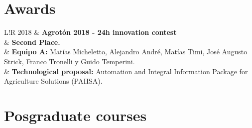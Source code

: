 \documentclass[10pt]{article}
\newcommand\VRule{\color{lightgray}\vrule width 0.5pt}
\begin{document}
\section{Awards}
\begin{tabular}{L!{\VRule}R}
2018 & {\bf Agrotón 2018 - 24h innovation contest} \\
	 & \textbf{Second Place.} \\
	 & \textbf{Equipo A:} Matías Micheletto, Alejandro André, Matías Timi, José Augusto Strick, Franco Tronelli y Guido Temperini. \\
	 & \textbf{Technological proposal:} Automation and Integral Information Package for Agriculture Solutions (PAIISA). \\
\end{tabular}

\section{Posgraduate courses}
\end{document}
